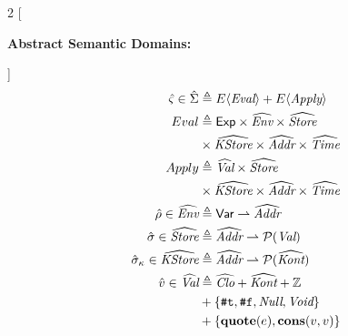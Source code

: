 \documentclass[12pt,draft]{article}
\newcommand{\truesyn}{\texttt{\#t}}
\newcommand{\falsesyn}{\texttt{\#f}}
\begin{document}
\begin{multicols*}{2}
  [
  \begin{center}
    \textbf{Abstract Semantic Domains:}
  \end{center}
  \vspace{-15mm}]
  \begin{align*}
    \vspace{-10mm}
    \hat{\varsigma} \in \hat{\Sigma}
    &\triangleq E\langle \textit{Eval} \rangle + E\langle \textit{Apply} \rangle\\
    Eval &\triangleq \textsf{Exp} \times \widehat{\textit{Env}} \times
           \widehat{\textit{Store}} \\
    &\times \widehat{\textit{KStore}} \times \widehat{\textit{Addr}}
      \times \widehat{\textit{Time}} \\
    Apply &\triangleq \widehat{\textit{Val}} \times \widehat{\textit{Store}} \\
    &\times \widehat{\textit{KStore}} \times \widehat{\textit{Addr}}
      \times \widehat{\textit{Time}} \\
    \hat{\rho} \in \widehat{\textit{Env}}
    &\triangleq \textsf{Var} \rightharpoonup \widehat{\textit{Addr}} \\
    \hat{\sigma} \in \widehat{\textit{Store}}
    &\triangleq \widehat{\textit{Addr}} \rightharpoonup \mathcal{P}(\textit{Val}) \\
    \hat{\sigma}_\kappa \in \widehat{\textit{KStore}}
    &\triangleq \widehat{\textit{Addr}}
      \rightharpoonup \mathcal{P}(\widehat{\textit{Kont}}) \\
    \hat{v} \in \widehat{\textit{Val}}
    &\triangleq \widehat{\textit{Clo}} + \widehat{\textit{Kont}} + \mathbb{Z} \\
    &+ \{\truesyn , \falsesyn , \textit{Null} , \textit{Void}\} \\
    &+ \{\textbf{quote}(e) , \textbf{cons}(v, v)\} \\

\end{align*}
\end{multicols*}
\end{document}
